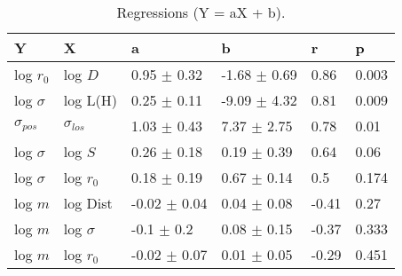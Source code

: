 \begin{table}
\centering
\caption{Regressions (Y = aX + b).}
\begin{tabular}{llllll}
\toprule
              Y &               X &                 a &                 b &      r &      p \\
\midrule
      log $r_0$ &         log $D$ &   0.95 $\pm$ 0.32 &  -1.68 $\pm$ 0.69 &   0.86 &  0.003 \\
   log $\sigma$ &        log L(H) &   0.25 $\pm$ 0.11 &  -9.09 $\pm$ 4.32 &   0.81 &  0.009 \\
 $\sigma_{pos}$ &  $\sigma_{los}$ &   1.03 $\pm$ 0.43 &   7.37 $\pm$ 2.75 &   0.78 &   0.01 \\
   log $\sigma$ &         log $S$ &   0.26 $\pm$ 0.18 &   0.19 $\pm$ 0.39 &   0.64 &   0.06 \\
   log $\sigma$ &     log $r_{0}$ &   0.18 $\pm$ 0.19 &   0.67 $\pm$ 0.14 &    0.5 &  0.174 \\
        log $m$ &        log Dist &  -0.02 $\pm$ 0.04 &   0.04 $\pm$ 0.08 &  -0.41 &   0.27 \\
        log $m$ &    log $\sigma$ &    -0.1 $\pm$ 0.2 &   0.08 $\pm$ 0.15 &  -0.37 &  0.333 \\
        log $m$ &     log $r_{0}$ &  -0.02 $\pm$ 0.07 &   0.01 $\pm$ 0.05 &  -0.29 &  0.451 \\
\bottomrule
\end{tabular}
\end{table}
